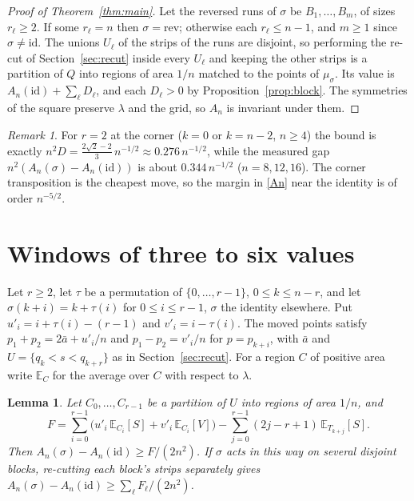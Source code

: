 \documentclass[11pt]{amsart}
\newtheorem{lemma}[theorem]{Lemma}
\theoremstyle{definition}
\theoremstyle{remark}
\newtheorem{remark}[theorem]{Remark}
\numberwithin{equation}{section}
\newcommand{\E}{\mathbb{E}}
\begin{document}
\begin{proof}[Proof of Theorem~\ref{thm:main}]
Let the reversed runs of $\sigma$ be $B_1,\dots,B_m$, of sizes $r_\ell\ge2$. If some $r_\ell=n$ then $\sigma=\mathrm{rev}$;
otherwise each $r_\ell\le n-1$, and $m\ge1$ since $\sigma\ne\mathrm{id}$. The unions $U_\ell$ of the strips of the runs are
disjoint, so performing the re-cut of Section~\ref{sec:recut} inside every $U_\ell$ and keeping the other strips is a partition of $Q$
into regions of area $1/n$ matched to the points of $\mu_\sigma$. Its value is $A_n(\mathrm{id})+\sum_\ell D_\ell$, and
each $D_\ell>0$ by Proposition~\ref{prop:block}. The symmetries of the square preserve $\lambda$ and the grid, so $A_n$
is invariant under them.
\end{proof}

\begin{remark}
For $r=2$ at the corner ($k=0$ or $k=n-2$, $n\ge4$) the bound is exactly
$n^2D=\frac{2\sqrt2-2}{3}\,n^{-1/2}\approx0.276\,n^{-1/2}$, while the measured gap $n^2(A_n(\sigma)-A_n(\mathrm{id}))$ is
about $0.344\,n^{-1/2}$ ($n=8,12,16$). The corner transposition is the cheapest move, so the margin in \eqref{An} near
the identity is of order $n^{-5/2}$.
\end{remark}

\section{Windows of three to six values}\label{sec:windows}

Let $r\ge2$, let $\tau$ be a permutation of $\{0,\dots,r-1\}$, $0\le k\le n-r$, and let $\sigma(k+i)=k+\tau(i)$ for
$0\le i\le r-1$, $\sigma$ the identity elsewhere. Put $u'_i=i+\tau(i)-(r-1)$ and $v'_i=i-\tau(i)$. The moved points
satisfy $p_1+p_2=2\bar a+u'_i/n$ and $p_1-p_2=v'_i/n$ for $p=p_{k+i}$, with $\bar a$ and $U=\{q_k<s<q_{k+r}\}$ as in
Section~\ref{sec:recut}. For a region $C$ of positive area write $\E_C$ for the average over $C$ with respect to $\lambda$.

\begin{lemma}\label{lem:window}
Let $C_0,\dots,C_{r-1}$ be a partition of $U$ into regions of area $1/n$, and
\[
F=\sum_{i=0}^{r-1}\bigl(u'_i\,\E_{C_i}[S]+v'_i\,\E_{C_i}[V]\bigr)-\sum_{j=0}^{r-1}(2j-r+1)\,\E_{T_{k+j}}[S].
\]
Then $A_n(\sigma)-A_n(\mathrm{id})\ge F/(2n^2)$. If $\sigma$ acts in this way on several disjoint blocks, re-cutting each
block's strips separately gives $A_n(\sigma)-A_n(\mathrm{id})\ge\sum_\ell F_\ell/(2n^2)$.
\end{lemma}
\end{document}
